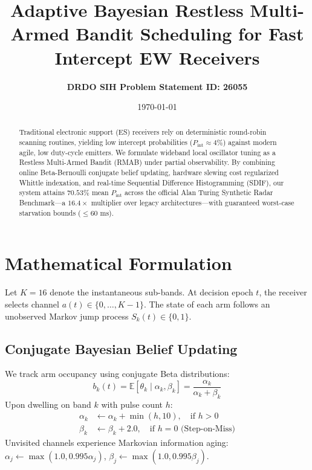 \documentclass[11pt,a4paper]{article}
\title{\textbf{Adaptive Bayesian Restless Multi-Armed Bandit Scheduling for Fast Intercept EW Receivers}}
\author{\textbf{DRDO SIH Problem Statement ID: 26055}}
\date{\today}
\begin{document}
\maketitle

\begin{abstract}
Traditional electronic support (ES) receivers rely on deterministic round-robin scanning routines, yielding low intercept probabilities ($P_{\text{int}} \approx 4\%$) against modern agile, low duty-cycle emitters. We formulate wideband local oscillator tuning as a Restless Multi-Armed Bandit (RMAB) under partial observability. By combining online Beta-Bernoulli conjugate belief updating, hardware slewing cost regularized Whittle indexation, and real-time Sequential Difference Histogramming (SDIF), our system attains $70.53\%$ mean $P_{\text{int}}$ across the official Alan Turing Synthetic Radar Benchmark—a $16.4\times$ multiplier over legacy architectures—with guaranteed worst-case starvation bounds ($\le 60\text{ ms}$).
\end{abstract}

\section{Mathematical Formulation}
Let $K = 16$ denote the instantaneous sub-bands. At decision epoch $t$, the receiver selects channel $a(t) \in \{0, \dots, K-1\}$. The state of each arm follows an unobserved Markov jump process $S_k(t) \in \{0, 1\}$.

\subsection{Conjugate Bayesian Belief Updating}
We track arm occupancy using conjugate Beta distributions:
\begin{equation}
b_k(t) = \mathbb{E}[\theta_k \mid \alpha_k, \beta_k] = \frac{\alpha_k}{\alpha_k + \beta_k}
\end{equation}
Upon dwelling on band $k$ with pulse count $h$:
\begin{align}
\alpha_k &\leftarrow \alpha_k + \min(h, 10), \quad \text{if } h > 0 \\
\beta_k &\leftarrow \beta_k + 2.0, \quad \text{if } h = 0 \text{ (Step-on-Miss)}
\end{align}
Unvisited channels experience Markovian information aging: $\alpha_j \leftarrow \max(1.0, 0.995 \alpha_j)$, $\beta_j \leftarrow \max(1.0, 0.995 \beta_j)$.
\end{document}
